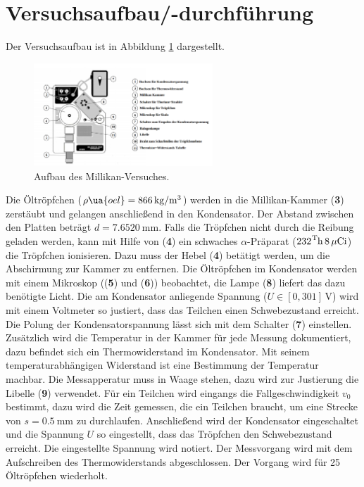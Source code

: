\section{Versuchsaufbau/-durchführung}

Der Versuchsaufbau ist in Abbildung \ref{fig: versuchsaufabu} dargestellt.
\begin{figure}
  \centering
  \includegraphics[width=0.6\textwidth]{pics/aufbau.png}
  \caption{Aufbau des Millikan-Versuches\cite{anleitung503}.}
  \label{fig: versuchsaufabu}
  \end{figure}
Die Öltröpfchen ($\rho\ua{oel}=\SI{866}{\kilogram\per\cubic\meter}$) werden in die Millikan-Kammer (\textbf{3}) zerstäubt
und gelangen anschließend in den Kondensator. Der Abstand zwischen den Platten beträgt $d=\SI{7.6520}{\milli\meter}$.
Falls die Tröpfchen nicht durch die
Reibung geladen werden, kann mit Hilfe von (\textbf{4}) ein schwaches
$\alpha$-Präparat ($\ce{{232}^Th}\,8\,\mu\ce{Ci}$) die Tröpfchen ionisieren. Dazu
muss der Hebel (\textbf{4}) betätigt werden, um die Abschirmung zur Kammer
zu entfernen.
Die Öltröpfchen im Kondensator werden mit einem Mikroskop ((\textbf{5}) und (\textbf{6})) beobachtet,
die Lampe (\textbf{8}) liefert das dazu benötigte Licht.
Die am Kondensator anliegende Spannung ($U\in\left[0,301\right]\,\si{\volt}$) %
wird mit einem Voltmeter so justiert, dass das Teilchen einen Schwebezustand erreicht. %
Die Polung der Kondensatorspannung lässt sich mit dem Schalter (\textbf{7}) einstellen.
Zusätzlich wird die Temperatur in der Kammer für jede Messung dokumentiert, dazu befindet sich
ein Thermowiderstand im Kondensator. Mit seinem temperaturabhängigen Widerstand ist eine Bestimmung
der Temperatur machbar. %
Die Messapperatur muss in Waage stehen, dazu wird zur Justierung die %
Libelle (\textbf{9}) verwendet.
Für ein Teilchen wird eingangs die Fallgeschwindigkeit $v_0$ bestimmt, dazu
wird die Zeit gemessen, die ein Teilchen braucht, um eine Strecke von $s=\SI{0.5}{\milli\meter}$
zu durchlaufen. Anschließend wird der Kondensator eingeschaltet und die Spannung
$U$ so eingestellt, dass das Tröpfchen den Schwebezustand erreicht. Die eingestellte %
Spannung wird notiert. Der Messvorgang wird mit dem Aufschreiben des Thermowiderstands %
abgeschlossen. Der Vorgang wird für 25 Öltröpfchen wiederholt.
